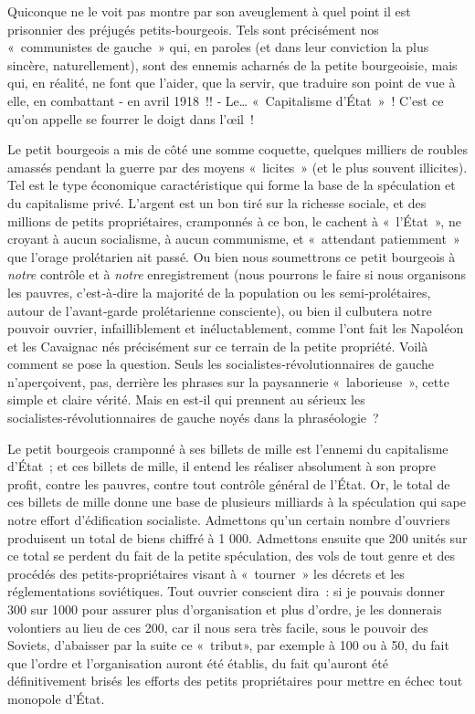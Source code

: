 \documentclass[french,twoside]{book} %
\begin{document}
Quiconque ne le voit pas montre par son aveuglement à quel point il est prisonnier des préjugés petits‑bourgeois. Tels sont précisément nos « communistes de gauche » qui, en paroles (et dans leur conviction la plus sincère, naturellement), sont des ennemis acharnés de la petite bourgeoisie, mais qui, en réalité, ne font que l’aider, que la servir, que traduire son point de vue à elle, en combattant ‑ en avril 1918 !! ‑ Le… « Capitalisme d’État » ! C'est ce qu’on appelle se fourrer le doigt dans l’œil !\par
Le petit bourgeois a mis de côté une somme coquette, quelques milliers de roubles amassés pendant la guerre par des moyens « licites » (et le plus souvent illicites). Tel est le type économique caractéristique qui forme la base de la spéculation et du capitalisme privé. L'argent est un bon tiré sur la richesse sociale, et des millions de petits propriétaires, cramponnés à ce bon, le cachent à \hspace{1em}« l’État », ne croyant à aucun socialisme, à aucun communisme, et « attendant patiemment » que l’orage prolétarien ait passé. Ou bien nous soumettrons ce petit bourgeois à \emph{notre} contrôle et à \emph{notre} enregistrement (nous pourrons le faire si nous organisons les pauvres, c’est‑à‑dire la majorité de la population ou les semi‑prolétaires, autour de l’avant‑garde prolétarienne consciente), ou bien il culbutera notre pouvoir ouvrier, infailliblement et inéluctablement, comme l’ont fait les Napoléon et les Cavaignac nés précisément sur ce terrain de la petite propriété. Voilà comment se pose la question. Seuls les socialistes‑révolutionnaires de gauche n’aperçoivent, pas, derrière les phrases sur la paysannerie « laborieuse », cette simple et claire vérité. Mais en est‑il qui prennent au sérieux les socialistes‑révolutionnaires de gauche noyés dans la phraséologie ?\par
Le petit bourgeois cramponné à ses billets de mille est l’ennemi du capitalisme d’État ; et ces billets de mille, il entend les réaliser absolument à son propre profit, contre les pauvres, contre tout contrôle général de l’État. Or, le total de ces billets de mille donne une base de plusieurs milliards à la spéculation qui sape notre effort d’édification socialiste. Admettons qu’un certain nombre d’ouvriers produisent un total de biens chiffré à 1 000. Admettons ensuite que 200 unités sur ce total se perdent du fait de la petite spéculation, des vols de tout genre et des procédés des petits‑propriétaires visant à « tourner » les décrets et les réglementations soviétiques. Tout ouvrier conscient dira : si je pouvais donner 300 sur 1000 pour assurer plus d’organisation et plus d’ordre, je les donnerais volontiers au lieu de ces 200, car il nous sera très facile, sous le pouvoir des Soviets, d’abaisser par la suite ce « tribut», par exemple à 100 ou à 50, du fait que l’ordre et l’organisation auront été établis, du fait qu’auront été définitivement brisés les efforts des petits propriétaires pour mettre en échec tout monopole d’État.\par
\end{document}
